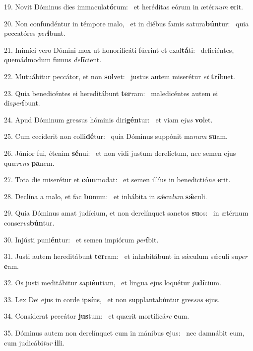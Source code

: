 19. Novit Dóminus dies immacula\textbf{tó}rum: \ast\  et heréditas eórum in ætér\textit{num} \textbf{e}rit.\

20. Non confundéntur in témpore malo, \dag\  et in diébus famis satura\textbf{bún}tur: \ast\  quia peccatóres \textit{per}\textbf{í}bunt.\

21. Inimíci vero Dómini mox ut honorificáti fúerint et exal\textbf{tá}ti: \ast\  deficiéntes, quemádmodum fumus \textit{de}\textbf{fí}cient.\

22. Mutuábitur peccátor, et non \textbf{sol}vet: \ast\  justus autem miserétur \textit{et} \textbf{trí}buet.\

23. Quia benedicéntes ei hereditábunt \textbf{ter}ram: \ast\  maledicéntes autem ei dis\textit{per}\textbf{í}bunt.\

24. Apud Dóminum gressus hóminis diri\textbf{gén}tur: \ast\  et viam e\textit{jus} \textbf{vo}let.\

25. Cum cecíderit non colli\textbf{dé}tur: \ast\  quia Dóminus suppónit ma\textit{num} \textbf{su}am.\

26. Júnior fui, étenim \textbf{sé}nui: \ast\  et non vidi justum derelíctum, nec semen ejus quæ\textit{rens} \textbf{pa}nem.\

27. Tota die miserétur et \textbf{cóm}modat: \ast\  et semen illíus in benedictió\textit{ne} \textbf{e}rit.\

28. Declína a malo, et fac \textbf{bo}num: \ast\  et inhábita in sǽcu\textit{lum} \textbf{sǽ}culi.\

29. Quia Dóminus amat judícium, et non derelínquet sanctos \textbf{su}os: \ast\  in ætérnum conser\textit{va}\textbf{bún}tur.\

30. Injústi puni\textbf{én}tur: \ast\  et semen impiórum \textit{per}\textbf{í}bit.\

31. Justi autem hereditábunt \textbf{ter}ram: \ast\  et inhabitábunt in sǽculum sǽculi su\textit{per} \textbf{e}am.\

32. Os justi meditábitur sapi\textbf{én}tiam, \ast\  et lingua ejus loquétur \textit{ju}\textbf{dí}cium.\

33. Lex Dei ejus in corde ip\textbf{sí}us, \ast\  et non supplantabúntur gres\textit{sus} \textbf{e}jus.\

34. Consíderat peccátor \textbf{jus}tum: \ast\  et quærit mortificá\textit{re} \textbf{e}um.\

35. Dóminus autem non derelínquet eum in mánibus \textbf{e}jus: \ast\  nec damnábit eum, cum judicábi\textit{tur} \textbf{il}li.\

